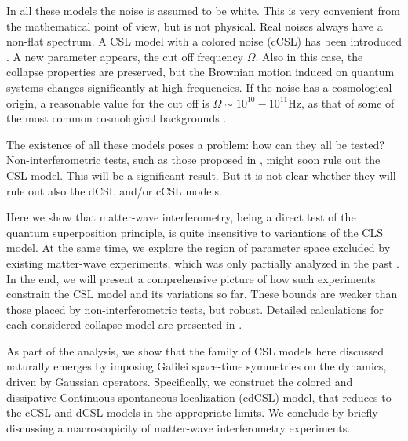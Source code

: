 \documentclass[prl,twocolumn,showpacs,superscriptaddress,groupedaddress]{revtex4}
\begin{document}
In all these models the noise is assumed to be white. This is very convenient from the mathematical point of view, but is not physical. Real noises always have a non-flat spectrum. A CSL model with a colored noise (cCSL) has been introduced \cite{PhysRevA.48.913,1751-8121-40-50-012,1751-8121-41-39-395308}. A new  parameter appears, the cut off frequency $\Omega$.  Also in this case, the collapse properties are preserved, but the Brownian motion induced on quantum systems changes significantly at high frequencies. If the noise has a cosmological origin, a reasonable value for the cut off is $\Omega \sim 10^{10}-10^{11}$Hz, as that of some of the most common cosmological backgrounds \cite{0295-5075-92-5-50006}.

The existence of all these models poses a problem: how can they all be tested? Non-interferometric tests, such as those proposed in \cite{PhysRevLett.112.210404,PhysRevA.89.032127,PhysRevLett.113.020405}, might soon rule out the CSL model. This will be a significant result. But it is not clear whether they will rule out also the dCSL and/or cCSL models.

Here we show that matter-wave interferometry, being a direct test of the quantum superposition principle, is quite insensitive to variantions of the CLS model. At the same time, we explore the region of parameter space excluded by existing matter-wave experiments, which was only partially analyzed in the past \cite{1751-8121-45-6-065304, PhysRevA.83.043621}. In the end, we will present a comprehensive picture of how such experiments constrain the CSL model and its variations so far. These bounds are weaker than those placed by non-interferometric tests, but robust. Detailed calculations for each considered collapse model are presented in \cite{matterwave}. 

As part of the analysis, we show that the family of CSL models here discussed naturally emerges by imposing Galilei space-time symmetries on the dynamics, driven by Gaussian operators. Specifically, we construct the colored and dissipative Continuous spontaneous localization (cdCSL) model, that reduces to the cCSL and dCSL models in the appropriate limits. We conclude by briefly discussing a macroscopicity of matter-wave interferometry experiments.
\end{document}

